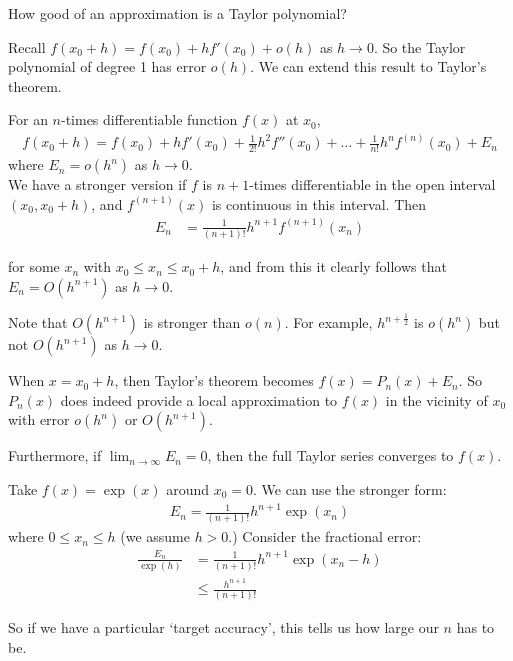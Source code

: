 \documentclass{../template/note}
\begin{document}
    How good of an approximation is a Taylor polynomial?

    Recall \(f(x_0+h)=f(x_0)+hf'(x_0)+o(h)\) as \(h \to 0\). So the Taylor polynomial of degree 1 has error \(o(h)\). We can extend this result to Taylor's theorem.

    \begin{theorem}
        For an \(n\)-times differentiable function \(f(x)\) at \(x_0\),
        \begin{align*}
            f(x_0+h) = f(x_0) + hf'(x_0) + \frac{1}{2!}h^2f''(x_0) + \dots + \frac{1}{n!}h^n f^{(n)}(x_0) + E_n
        \end{align*}
        where \(E_n = o(h^n)\) as \(h \to 0\). \\
    
        We have a stronger version if \(f\) is \(n+1\)-times differentiable in the open interval \((x_0, x_0+h)\), and \(f^{(n+1)}(x)\) is continuous in this interval. Then
        \begin{align*}
            E_n &= \frac{1}{(n+1)!}h^{n+1}f^{(n+1)}(x_n)
        \end{align*}
        
        for some \(x_n\) with \(x_0 \leq x_n \leq x_0+h\), and from this it clearly follows that \(E_n = O(h^{n+1})\) as \(h \to 0\).
        
        
    \end{theorem}
    
    \begin{remark*}
        Note that \(O(h^{n+1})\) is stronger than \(o(n)\). For example, \(h^{n+\frac 1 2}\) is \(o(h^n)\) but not \(O(h^{n+1})\) as \(h \to 0\).
    \end{remark*}
    
    When \(x = x_0 + h\), then Taylor's theorem becomes \(f(x) = P_n(x) + E_n\). So \(P_n(x)\) does indeed provide a local approximation to \(f(x)\) in the vicinity of \(x_0\) with error \(o(h^n)\) or \(O(h^{n+1})\).

    Furthermore, if \(\lim_{n \to \infty}E_n = 0\), then the full Taylor series converges to \(f(x)\).
    
    \begin{example}
        Take \(f(x) = \exp(x)\) around \(x_0 = 0\). We can use the stronger form:
        \begin{align*}
            E_n = \frac{1}{(n+1)!}h^{n+1}\exp(x_n)
        \end{align*}
        where \(0 \leq x_n \leq h\) (we assume \(h > 0\).) Consider the fractional error:
        \begin{align*}
            \frac{E_n}{\exp(h)} &= \frac{1}{(n+1)!}h^{n+1}\exp(x_n-h) \\
            &\leq \frac{h^{n+1}}{(n+1)!}
        \end{align*}
        
        \noindent So if we have a particular `target accuracy', this tells us how large our \(n\) has to be.
        
    \end{example}
    
\end{document}
